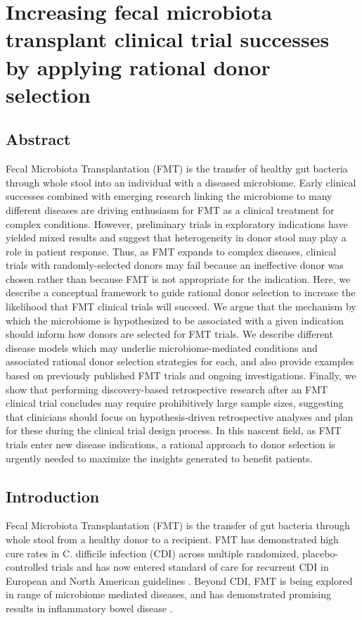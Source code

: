\chapter{Increasing fecal microbiota transplant clinical trial successes by applying rational donor selection}

\section*{Abstract}

Fecal Microbiota Transplantation (FMT) is the transfer of healthy gut bacteria through whole stool into an individual with a diseased microbiome.
Early clinical successes combined with emerging research linking the microbiome to many different diseases are driving enthusiasm for FMT as a clinical treatment for complex conditions.
However, preliminary trials in exploratory indications have yielded mixed results and suggest that heterogeneity in donor stool may play a role in patient response.
Thus, as FMT expands to complex diseases, clinical trials with randomly-selected donors may fail because an ineffective donor was chosen rather than because FMT is not appropriate for the indication.
Here, we describe a conceptual framework to guide rational donor selection to increase the likelihood that FMT clinical trials will succeed.
We argue that the mechanism by which the microbiome is hypothesized to be associated with a given indication should inform how donors are selected for FMT trials.
We describe different disease models which may underlie microbiome-mediated conditions and associated rational donor selection strategies for each, and also provide examples based on previously published FMT trials and ongoing investigations.
Finally, we show that performing discovery-based retrospective research after an FMT clinical trial concludes may require prohibitively large sample sizes, suggesting that clinicians should focus on hypothesis-driven retrospective analyses and plan for these during the clinical trial design process.
In this nascent field, as FMT trials enter new disease indications, a rational approach to donor selection is urgently needed to maximize the insights generated to benefit patients.

\newpage

\section{Introduction}

Fecal Microbiota Transplantation (FMT) is the transfer of gut bacteria through whole stool from a healthy donor to a recipient.
FMT has demonstrated high cure rates in C. difficile infection (CDI) across multiple randomized, placebo-controlled trials \cite{Quraishi2017} and has now entered standard of care for recurrent CDI in European and North American guidelines \cite{McDonald2018,Cammarota2017,Surawicz2013}.
Beyond CDI, FMT is being explored in range of microbiome mediated diseases, and has demonstrated promising results in inflammatory bowel disease \cite{Panchal2018,Gelfand2018,Kootte2017,Osman2018,Costello2017,Paramsothy2017}.

